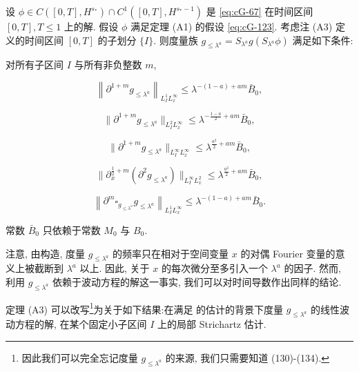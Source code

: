 \begin{proposition}\label{prop:cG-6.14}
设 $\phi \in C([0, T], H^{s_*})\cap C^1([0, T], H^{s_* - 1})$ 是 \eqref{eq:cG-67} 在时间区间 $[0, T], T\leq 1$ 上的解. 假设 $\phi$ 满足定理 (A1) 的假设 \eqref{eq:cG-123}. 考虑注 (A3) 定义的时间区间 $[0, T]$ 的子划分 $\{I\}$. 则度量族 $g_{\leq \lambda^a} = S_{\lambda^a}g(S_{\lambda^a}\phi)$ 满足如下条件:

对所有子区间 $I$ 与所有非负整数 $m$, 

\begin{equation}
\left\|\partial^{1 + m}g_{\leq\lambda^{a}}\right\|_{L_{I}^{1}L_{x}^{\infty}} \leq \lambda^{-(1 - a) + am}\bar{B}_{0}, \label{eq:cG-130}
\end{equation}

\begin{equation}
\|\partial^{1 + m}g_{\leq\lambda^{a}}\|_{L_{I}^{2}L_{x}^{\infty}} \leq \lambda^{-\frac{1 - a}{2} + am}\bar{B}_{0}, \label{eq:cG-131}
\end{equation}

\begin{equation}
\|\partial^{1 + m}g_{\leq\lambda^{a}}\|_{L_{I}^{\infty}L_{x}^{\infty}} \leq \lambda^{\frac{a^{2}}{2} + am}\bar{B}_{0}, \label{eq:cG-132}
\end{equation}

\begin{equation}
\|\partial_{x}^{\frac{1}{2} + m}(\partial^{2}g_{\leq\lambda^{a}})\|_{L_{I}^{\infty}L_{x}^{2}} \leq \lambda^{\frac{a^{2}}{2} + am}\bar{B}_{0}, \label{eq:cG-133}
\end{equation}

\begin{equation}
\left\|\partial^{m}\square_{g_{\leq\lambda^{a}}}g_{\leq\lambda^{a}}\right\|_{L_{I}^{1}L_{x}^{\infty}} \leq \lambda^{-(1 - a) + am}\bar{B}_{0}.\label{eq:cG-134}
\end{equation}

常数 $\bar{B}_0$ 只依赖于常数 $M_0$ 与 $B_0$. 
\end{proposition}

\begin{remark*}
注意, 由构造, 度量 $g_{\leq\lambda^{a}}$ 的频率只在相对于空间变量 $x$ 的对偶 Fourier 变量的意义上被截断到 $\lambda^{a}$ 以上. 因此, 关于 $x$ 的每次微分至多引入一个 $\lambda^a$ 的因子. 然而, 利用 $g_{\leq \lambda^a}$ 依赖于波动方程的解这一事实, 我们可以对时间导数作出同样的结论. 
\end{remark*}

定理 (A3) 可以改写\footnote{因此我们可以完全忘记度量 $g_{\leq\lambda^{a}}$ 的来源, 我们只需要知道 (130)-(134). }为关于如下结果:在满足  的估计的背景下度量 $g_{\leq\lambda^{a}}$ 的线性波动方程的解, 在某个固定小子区间 $I$ 上的局部 Strichartz 估计. 

